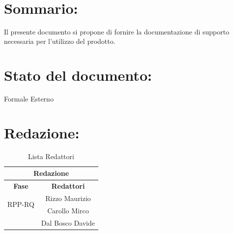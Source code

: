 \newpage
 
\begin{center} %
  \begin{Huge}  
        \textbf{\TITOLODOC}
      \\
  \end{Huge}
\end{center}
 
\section*{\LARGE Sommario:}
Il presente documento si propone di fornire la documentazione di supporto necessaria per l'utilizzo del prodotto.
 
\indent \indent
 
\section*{\LARGE Stato del documento:}
\indent \indent
  Formale Esterno
 
\section*{\LARGE Redazione:}
  \begin{table}[!h]
    \begin{center}
      \begin{tabular}
        {|c|c|}
        \hline
        \multicolumn{2}{|c|}{ \textbf{Redazione} } \\
        \hline
        \textbf{Fase} & \textbf{Redattori} \\
        \hline
        \multirow{2}{*}{RPP-RQ} & Rizzo Maurizio\\
                    & Carollo Mirco\\
                    & Dal Bosco Davide\\
        \hline
      \end{tabular}
      \caption{Lista Redattori} %
      \label{tabredazione}
    \end{center}
  \end{table}
  
